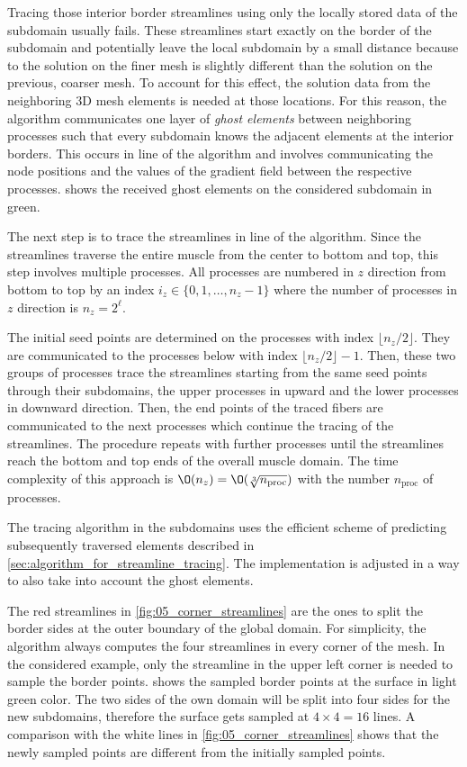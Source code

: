 Tracing those interior border streamlines using only the locally stored data of the subdomain usually fails. These streamlines start exactly on the border of the subdomain and potentially leave the local subdomain by a small distance because to the solution on the finer mesh is slightly different than the solution on the previous, coarser mesh. To account for this effect, the solution data from the neighboring 3D mesh elements is needed at those locations. For this reason, the algorithm communicates one layer of \emph{ghost elements} between neighboring processes such that every subdomain knows the adjacent elements at the interior borders. This occurs in line  of the algorithm and involves communicating the node positions and the values of the gradient field between the respective processes.  shows the received ghost elements on the considered subdomain in green.


The next step is to trace the streamlines in line  of the algorithm. Since the streamlines traverse the entire muscle from the center to bottom and top, this step involves multiple processes. All processes are numbered in $z$ direction from bottom to top by an index $i_z \in \{0, 1, \dots, n_z-1\}$ where the number of processes in $z$ direction is $n_z = 2^\ell$.

The initial seed points are determined on the processes with index $\lfloor n_z/2\rfloor$. They are communicated to the processes below with index $\lfloor n_z/2\rfloor-1$. Then, these two groups of processes  trace the streamlines starting from the same seed points through their subdomains, the upper processes in upward and the lower processes in downward direction. Then, the end points of the traced fibers are communicated to the next processes which continue the tracing of the streamlines. The procedure repeats with further processes until the streamlines reach the bottom and top ends of the overall muscle domain.
The time complexity of this approach is $\O(n_z) = \O(\sqrt[3]{n_\text{proc}})$ with the number $n_\text{proc}$ of processes.

The tracing algorithm in the subdomains uses the efficient scheme of predicting subsequently traversed elements described in \cref{sec:algorithm_for_streamline_tracing}. The implementation is adjusted in a way to also take into account the ghost elements.

The red streamlines in \cref{fig:05_corner_streamlines} are the ones to split the border sides at the outer boundary of the global domain. For simplicity, the algorithm always computes the four streamlines in every corner of the mesh. In the considered example, only the streamline in the upper left corner is needed to sample the border points.  shows the sampled border points at the surface in light green color. The two sides of the own domain will be split into four sides for the new subdomains, therefore the surface gets sampled at $4\times 4=16$ lines. A comparison with the white lines in \cref{fig:05_corner_streamlines} shows that the newly sampled points are different from the initially sampled points. 

